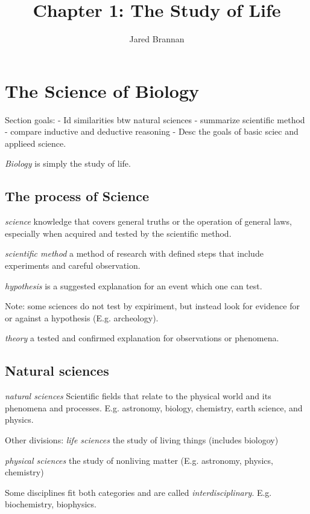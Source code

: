 \documentclass{article}
\title{Chapter 1: The Study of Life}
\author{Jared Brannan }
\theoremstyle{definition}
\begin{document}
\maketitle

\section{The Science of Biology}

Section goals:
- Id similarities btw natural sciences
- summarize scientific method
- compare inductive and deductive reasoning
- Desc the goals of basic sciec and applieed science.

 \textit{Biology} is simply the study of life.

\subsection{The process of Science}

 \textit{science}
knowledge that covers general truths or the operation of general laws, especially when acquired and tested by the scientific method.

 \textit{scientific method}
a method of research with defined steps that include experiments and careful observation.

 \textit{hypothesis}
is a suggested explanation for an event which one can test.

Note: some sciences do not test by expiriment, but instead look for evidence for or against a hypothesis (E.g. archeology).

 \textit{theory}
a tested and confirmed explanation for observations or phenomena.

\subsection{Natural sciences}
 \textit{natural sciences}
Scientific fields that relate to the physical world and its phenomena and processes.
E.g.  astronomy, biology, chemistry, earth science, and physics.

Other divisions:
 \textit{life sciences}
the study of living things (includes biologoy)

 \textit{physical sciences}
the study of nonliving matter (E.g. astronomy, physics, chemistry)

Some disciplines fit both categories and are called \textit{interdisciplinary}.
E.g. biochemistry, biophysics.
\end{document}
